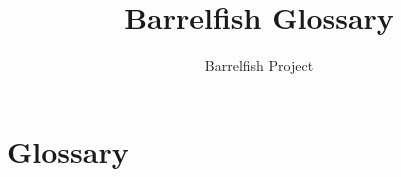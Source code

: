 \documentclass[a4paper,twoside]{report} %
\title{Barrelfish Glossary}
\author{Barrelfish Project}
\begin{document}
\maketitle			%

\begin{versionhistory}
\end{versionhistory}

\chapter*{Glossary}		%

\begin{description}

\end{description}
\end{document}
